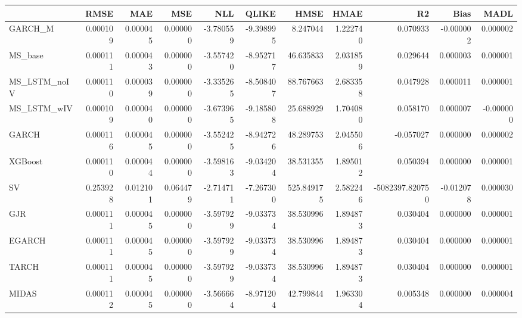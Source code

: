 \begin{tabular}{lrrrrrrrrrr}
\toprule
 & RMSE & MAE & MSE & NLL & QLIKE & HMSE & HMAE & R2 & Bias & MADL \\
\midrule
GARCH_M & 0.000109 & 0.000045 & 0.000000 & -3.780559 & -9.398995 & 8.247044 & 1.222740 & 0.070933 & -0.000002 & 0.000002 \\
MS_base & 0.000111 & 0.000043 & 0.000000 & -3.557420 & -8.952717 & 46.635833 & 2.031859 & 0.029644 & 0.000003 & 0.000001 \\
MS_LSTM_noIV & 0.000110 & 0.000039 & 0.000000 & -3.335265 & -8.508407 & 88.767663 & 2.683358 & 0.047928 & 0.000011 & 0.000001 \\
MS_LSTM_wIV & 0.000109 & 0.000040 & 0.000000 & -3.673965 & -9.185808 & 25.688929 & 1.704080 & 0.058170 & 0.000007 & -0.000000 \\
GARCH & 0.000116 & 0.000045 & 0.000000 & -3.552425 & -8.942726 & 48.289753 & 2.045506 & -0.057027 & 0.000000 & 0.000002 \\
XGBoost & 0.000110 & 0.000044 & 0.000000 & -3.598163 & -9.034204 & 38.531355 & 1.895012 & 0.050394 & 0.000000 & 0.000001 \\
SV & 0.253928 & 0.012101 & 0.064479 & -2.714711 & -7.267300 & 525.849175 & 2.582246 & -5082397.820750 & -0.012078 & 0.000030 \\
GJR & 0.000111 & 0.000045 & 0.000000 & -3.597929 & -9.033734 & 38.530996 & 1.894873 & 0.030404 & 0.000000 & 0.000001 \\
EGARCH & 0.000111 & 0.000045 & 0.000000 & -3.597929 & -9.033734 & 38.530996 & 1.894873 & 0.030404 & 0.000000 & 0.000001 \\
TARCH & 0.000111 & 0.000045 & 0.000000 & -3.597929 & -9.033734 & 38.530996 & 1.894873 & 0.030404 & 0.000000 & 0.000001 \\
MIDAS & 0.000112 & 0.000045 & 0.000000 & -3.566664 & -8.971204 & 42.799844 & 1.963304 & 0.005348 & 0.000000 & 0.000004 \\
\bottomrule
\end{tabular}
